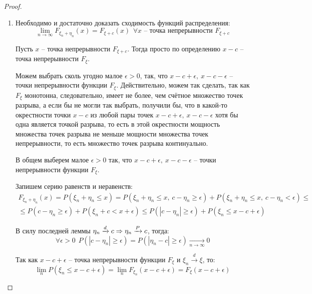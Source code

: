\begin{proof}~
    \begin{enumerate}
        \item Необходимо и достаточно доказать сходимость функций распределения:
        \[
        \lim_{n \to \infty} F_{\xi_n + \eta_n}(x) = F_{\xi + c}(x) \ \ \forall x \text{ -- точка непрерывности } F_{\xi + c}
        \]

        Пусть $x$ -- точка непрерывности $F_{\xi+c}$. Тогда просто по определению $x-c$ -- точка непрерывности $F_{\xi}$.

        Можем выбрать сколь угодно малое $\epsilon > 0$, так, что $x-c+\epsilon,\ x-c-\epsilon$ -- точки непрерывности функции $F_\xi$. Действительно, можем так сделать, так как $F_\xi$ монотонна, следовательно, имеет не более, чем счётное множество точек разрыва, а если бы не могли так выбрать, получили бы, что в какой-то окрестности точки $x-c$ из любой пары точек $x-c+\epsilon,\ x-c-\epsilon$ хотя бы одна является точкой разрыва, то есть в этой окрестности мощность множества точек разрыва не меньше мощности множества точек непрерывности, то есть множество точек разрыва континуально.
        
        В общем выберем малое $\epsilon > 0$ так, что $x-c+\epsilon,\ x-c-\epsilon$ -- точки непрерывности функции $F_\xi$.

        Запишем серию равенств и неравенств:
        \begin{multline*}
            F_{\xi_n + \eta_n}(x) = P(\xi_n + \eta_n \leqslant x) = P(\xi_n + \eta_n \leqslant x,\ c - \eta_n \geqslant \epsilon) + P(\xi_n + \eta_n \leqslant x,\ c - \eta_n < \epsilon) \leqslant
            \\
            \leqslant P(c - \eta_n \geqslant \epsilon) + P(\xi_n + c < x + \epsilon) \leqslant P(|c - \eta_n| \geqslant \epsilon) + P(\xi_n \leqslant x - c + \epsilon)
        \end{multline*}

        В силу последней леммы $\eta_n \xrightarrow{d} c \Rightarrow \eta_n \xrightarrow{P} c$, тогда:
        \[
            \forall \epsilon > 0 \ \ P(|c - \eta_n| \geqslant \epsilon) = P(|\eta_n - c| \geqslant \epsilon) \xrightarrow[n \to \infty]{} 0
        \]

        Так как $x-c+\epsilon$ -- точка непрерывности функции $F_\xi$ и $\xi_n \xrightarrow{d} \xi$, то:
        \[
            \lim_n P(\xi_n \leqslant x - c + \epsilon) = \lim_n F_{\xi_n}(x - c + \epsilon) = F_\xi(x - c + \epsilon)
        \]


\end{enumerate}
\end{proof}
